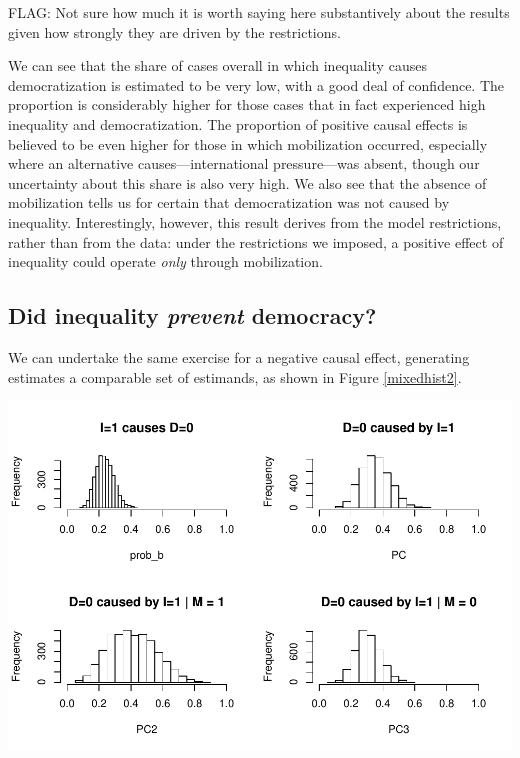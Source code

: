 \documentclass[
  12pt,
]{book}
\begin{document}
FLAG: Not sure how much it is worth saying here substantively about the results given how strongly they are driven by the restrictions.

We can see that the share of cases overall in which inequality causes democratization is estimated to be very low, with a good deal of confidence. The proportion is considerably higher for those cases that in fact experienced high inequality and democratization. The proportion of positive causal effects is believed to be even higher for those in which mobilization occurred, especially where an alternative causes---international pressure---was absent, though our uncertainty about this share is also very high. We also see that the absence of mobilization tells us for certain that democratization was not caused by inequality. Interestingly, however, this result derives from the model restrictions, rather than from the data: under the restrictions we imposed, a positive effect of inequality could operate \emph{only} through mobilization.

\hypertarget{did-inequality-prevent-democracy}{%
\subsection{\texorpdfstring{Did inequality \emph{prevent} democracy?}{Did inequality prevent democracy?}}\label{did-inequality-prevent-democracy}}

We can undertake the same exercise for a negative causal effect, generating estimates a comparable set of estimands, as shown in Figure \ref{mixedhist2}.

\includegraphics{ii_files/figure-latex/mixedhist2-1.pdf}
\end{document}

